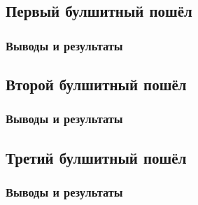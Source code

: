 \subsection{Первый булшитный пошёл}
\subsubsection{Выводы и результаты}

\subsection{Второй булшитный пошёл}
\subsubsection{Выводы и результаты}

\subsection{Третий булшитный пошёл}
\subsubsection{Выводы и результаты}
